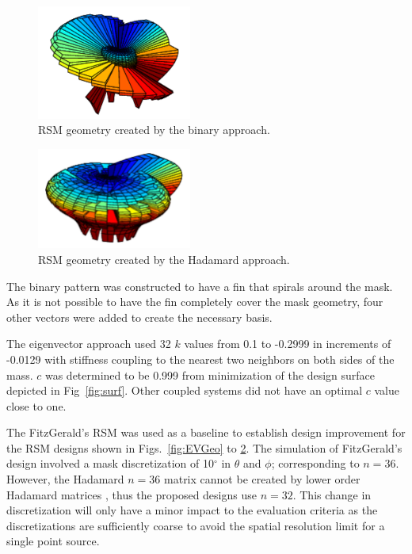 \documentclass[3p,times]{elsarticle}
\begin{document}
\begin{figure}[ht!]
\includegraphics[width={2.0in}]{../figs/BiGeo.pdf}
\centering
\caption{RSM geometry created by the binary approach.}
\label{fig:BiGeo}

\end{figure}
\begin{figure}[ht!]
\centering
\includegraphics[width={2.0in}]{../figs/HadGeo.pdf}
\caption{RSM geometry created by the Hadamard approach.}
\label{fig:HadGeo}
\end{figure}

The binary pattern was constructed to have a fin that spirals around the mask.  
As it is not possible to have the fin completely cover the mask geometry, four other vectors were added to create the necessary basis.

The eigenvector approach used 32 $k$ values from 0.1 to -0.2999 in increments of -0.0129 with stiffness coupling to the nearest two neighbors on both sides of the mass.
$c$ was determined to be 0.999 from minimization of the design surface depicted in Fig~\ref{fig:surf}.  
Other coupled systems did not have an optimal $c$ value close to one.

The FitzGerald's RSM was used as a baseline to establish design improvement for the RSM designs shown in Figs.~\ref{fig:EVGeo} to \ref{fig:HadGeo}.  
The simulation of FitzGerald's design involved a mask discretization of 10$^\circ$ in $\theta$ and $\phi$; corresponding to $n=36$.  However, the Hadamard $n=36$ matrix cannot be created by lower order Hadamard matrices \cite{Weisstein}, thus the proposed designs use $n=32$. 
This change in discretization will only have a minor impact to the evaluation criteria as the discretizations are sufficiently coarse to avoid the spatial resolution limit for a single point source.
\end{document}
